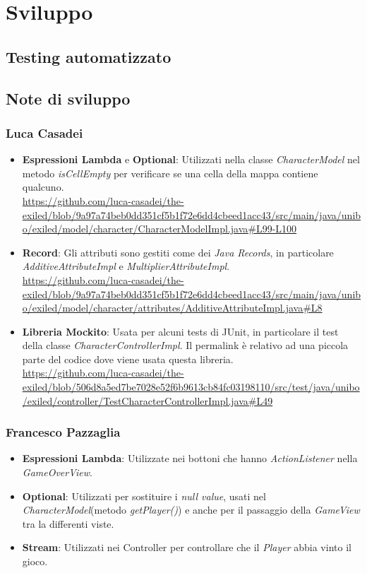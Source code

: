 \documentclass[a4paper,12pt]{report}
\begin{document}
\chapter{Sviluppo}

\section{Testing automatizzato}
\section{Note di sviluppo}

\subsection*{Luca Casadei}
\begin{itemize}
	\item \textbf{Espressioni Lambda} e \textbf{Optional}: Utilizzati nella classe \textit{CharacterModel} nel metodo \textit{isCellEmpty} per verificare se una cella della mappa contiene qualcuno.\\
	\url{https://github.com/luca-casadei/the-exiled/blob/9a97a74beb0dd351cf5b1f72e6dd4cbeed1acc43/src/main/java/unibo/exiled/model/character/CharacterModelImpl.java#L99-L100}
	\item \textbf{Record}: Gli attributi sono gestiti come dei \textit{Java Records}, in particolare \textit{AdditiveAttributeImpl} e \textit{MultiplierAttributeImpl}.\\
	\url{https://github.com/luca-casadei/the-exiled/blob/9a97a74beb0dd351cf5b1f72e6dd4cbeed1acc43/src/main/java/unibo/exiled/model/character/attributes/AdditiveAttributeImpl.java#L8}
	\item \textbf{Libreria Mockito}: Usata per alcuni tests di JUnit, in particolare il test della classe \textit{CharacterControllerImpl}. Il permalink è relativo ad una piccola parte del codice dove viene usata questa libreria.\\
	\url{https://github.com/luca-casadei/the-exiled/blob/506d8a5ed7be7028e52f6b9613cb84fc03198110/src/test/java/unibo/exiled/controller/TestCharacterControllerImpl.java#L49}
\end{itemize}

\subsection*{Francesco Pazzaglia}

\begin{itemize}
	\item \textbf{Espressioni Lambda}: Utilizzate nei bottoni che hanno \textit{ActionListener} nella \textit{GameOverView}.
	\item \textbf{Optional}: Utilizzati per sostituire i \textit{null value}, usati nel \textit{CharacterModel}(metodo \textit{getPlayer()}) e anche per il passaggio della \textit{GameView} tra la differenti viste.
	\item \textbf{Stream}: Utilizzati nei Controller per controllare che il \textit{Player} abbia vinto il gioco.
\end{itemize}
\end{document}
